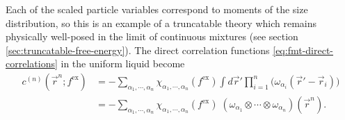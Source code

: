 Each of the scaled particle variables correspond to moments of the size distribution, so this is an example of a truncatable theory which remains physically well-posed in the limit of continuous mixtures (see section \ref{sec:truncatable-free-energy}).
The direct correlation functions \eqref{eq:fmt-direct-correlations} in the uniform liquid become \cite{RosenfeldJCP1990}
\begin{equation}\label{eq:fmt-direct-correlations-uniform-density}
  \begin{split}
    c^{(n)}(\vec{r}^n; f^\mathrm{ex})
    &=
    - \sum_{\alpha_1, \cdots, \alpha_n}
    \chi_{\alpha_1, \cdots, \alpha_n}(f^\mathrm{ex})
    \int d\vec{r}'
    \prod_{i=1}^n \Big( \omega_{\alpha_i}(\vec{r}' - \vec{r}_i) \Big)
    \\ &=
    - \sum_{\alpha_1, \cdots, \alpha_n}
    \chi_{\alpha_1, \cdots, \alpha_n}(f^\mathrm{ex}) \;
    (\omega_{\alpha_1} \otimes \cdots \otimes \omega_{\alpha_n})
    (\vec{r}^n).
  \end{split}
\end{equation}

\vspace{0.5em}

